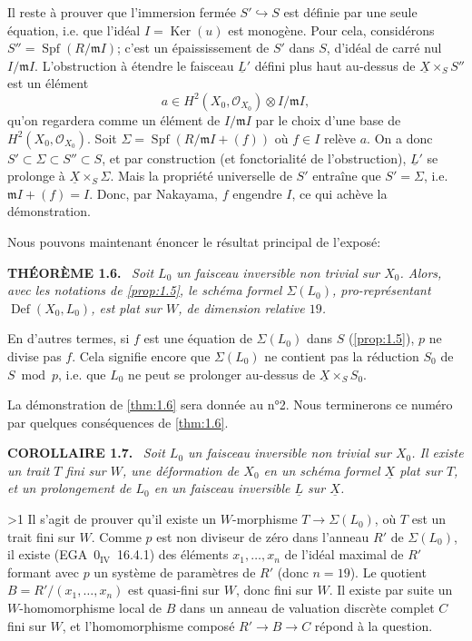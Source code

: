\documentclass[10pt]{article}
\makeatletter
\DeclareMathOperator{\Def}{Def}
\DeclareMathOperator{\Spf}{Spf}
\DeclareMathOperator{\Ker}{Ker}
\newcommand{\UX}{\underline{X}}
\newcommand{\UL}{\underline{L}}
\newcommand{\sourceanchor}[2]{\begingroup\def\@currentlabel{#2}\label{#1}\endgroup}
\newenvironment{sourcestatement}[3]{\par\smallskip\noindent\textbf{#1 #2.}\sourceanchor{#3}{#2}\ \itshape}{\par\normalfont\smallskip}
\newcommand{\DPage}[2]{\ifnum#1>1\clearpage\fi\setcounter{page}{#2}}
\makeatother
\begin{document}
Il reste à prouver que l'immersion fermée $S' \hookrightarrow S$ est définie par une seule équation, i.e. que l'idéal $I = \Ker(u)$ est monogène. Pour cela, considérons $S'' = \Spf(R/\mathfrak{m}I)$; c'est un épaississement de $S'$ dans $S$, d'idéal de carré nul $I/\mathfrak{m}I$. L'obstruction à étendre le faisceau $\UL'$ défini plus haut au-dessus de $\UX \times_S S''$ est un élément
\[
a \in H^2(X_0, \mathcal{O}_{X_0}) \otimes I/\mathfrak{m}I,
\]
qu'on regardera comme un élément de $I/\mathfrak{m}I$ par le choix d'une base de $H^2(X_0, \mathcal{O}_{X_0})$. Soit $\Sigma = \Spf(R/\mathfrak{m}I + (f))$ où $f \in I$ relève $a$. On a donc $S' \subset \Sigma \subset S'' \subset S$, et par construction (et fonctorialité de l'obstruction), $\UL'$ se prolonge à $\UX \times_S \Sigma$. Mais la propriété universelle de $S'$ entraîne que $S' = \Sigma$, i.e. $\mathfrak{m}I + (f) = I$. Donc, par Nakayama, $f$ engendre $I$, ce qui achève la démonstration.

\medskip
Nous pouvons maintenant énoncer le résultat principal de l'exposé:

\begin{sourcestatement}{THÉORÈME}{1.6}{thm:1.6}
Soit $L_0$ un faisceau inversible non trivial sur $X_0$. Alors, avec les notations de \ref{prop:1.5}, le schéma formel $\Sigma(L_0)$, pro-représentant $\Def(X_0, L_0)$, est plat sur $W$, de dimension relative $19$.
\end{sourcestatement}

En d'autres termes, si $f$ est une équation de $\Sigma(L_0)$ dans $S$ (\ref{prop:1.5}), $p$ ne divise pas $f$. Cela signifie encore que $\Sigma(L_0)$ ne contient pas la réduction $S_0$ de $S \bmod p$, i.e. que $L_0$ ne peut se prolonger au-dessus de $\UX \times_S S_0$.

La démonstration de \ref{thm:1.6} sera donnée au n°2. Nous terminerons ce numéro par quelques conséquences de \ref{thm:1.6}.

\begin{sourcestatement}{COROLLAIRE}{1.7}{cor:1.7}
Soit $L_0$ un faisceau inversible non trivial sur $X_0$. Il existe un trait $T$ fini sur $W$, une déformation de $X_0$ en un schéma formel $\UX$ plat sur $T$, et un prolongement de $L_0$ en un faisceau inversible $\UL$ sur $\UX$.
\end{sourcestatement}

\DPage{6}{63}
Il s'agit de prouver qu'il existe un $W$-morphisme $T \to \Sigma(L_0)$, où $T$ est un trait fini sur $W$. Comme $p$ est non diviseur de zéro dans l'anneau $R'$ de $\Sigma(L_0)$, il existe (EGA~0$_{\mathrm{IV}}$~16.4.1) des éléments $x_1, \ldots, x_n$ de l'idéal maximal de $R'$ formant avec $p$ un système de paramètres de $R'$ (donc $n = 19$). Le quotient $B = R'/(x_1, \ldots, x_n)$ est quasi-fini sur $W$, donc fini sur $W$. Il existe par suite un $W$-homomorphisme local de $B$ dans un anneau de valuation discrète complet $C$ fini sur $W$, et l'homomorphisme composé $R' \to B \to C$ répond à la question.
\end{document}
